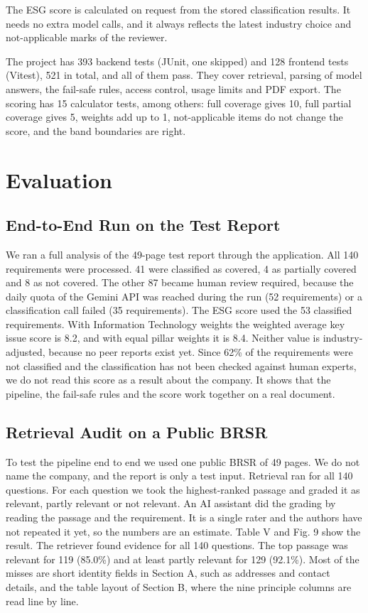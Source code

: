 \documentclass[conference]{IEEEtran}
\begin{document}
The ESG score is calculated on request from the stored classification results. It needs no extra model calls, and it always reflects the latest industry choice and not-applicable marks of the reviewer.

The project has 393 backend tests (JUnit, one skipped) and 128 frontend tests (Vitest), 521 in total, and all of them pass. They cover retrieval, parsing of model answers, the fail-safe rules, access control, usage limits and PDF export. The scoring has 15 calculator tests, among others: full coverage gives 10, full partial coverage gives 5, weights add up to 1, not-applicable items do not change the score, and the band boundaries are right.

\section{Evaluation}
\subsection{End-to-End Run on the Test Report}
We ran a full analysis of the 49-page test report through the application. All 140 requirements were processed. 41 were classified as covered, 4 as partially covered and 8 as not covered. The other 87 became human review required, because the daily quota of the Gemini API was reached during the run (52 requirements) or a classification call failed (35 requirements). The ESG score used the 53 classified requirements. With Information Technology weights the weighted average key issue score is 8.2, and with equal pillar weights it is 8.4. Neither value is industry-adjusted, because no peer reports exist yet. Since 62\% of the requirements were not classified and the classification has not been checked against human experts, we do not read this score as a result about the company. It shows that the pipeline, the fail-safe rules and the score work together on a real document.

\subsection{Retrieval Audit on a Public BRSR}
To test the pipeline end to end we used one public BRSR of 49 pages. We do not name the company, and the report is only a test input. Retrieval ran for all 140 questions. For each question we took the highest-ranked passage and graded it as relevant, partly relevant or not relevant. An AI assistant did the grading by reading the passage and the requirement. It is a single rater and the authors have not repeated it yet, so the numbers are an estimate. Table V and Fig. 9 show the result. The retriever found evidence for all 140 questions. The top passage was relevant for 119 (85.0\%) and at least partly relevant for 129 (92.1\%). Most of the misses are short identity fields in Section A, such as addresses and contact details, and the table layout of Section B, where the nine principle columns are read line by line.
\end{document}
